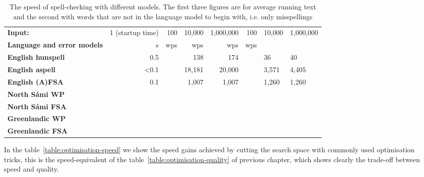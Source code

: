 \documentclass[a4paper,12pt]{article}
\begin{document}
\begin{table}
    \centering
    \begin{tabular}{|l|r||r|r|r|r|}
        \hline
        \bf Input: & 1 (startup time) & 100 & 10,000 & 1,000,000 & 100 & 10,000 & 1,000,000 \\
        \bf Language and error models & s & wps & wps & wps & wps \\
        \hline
        \bf English hunspell & 0.5 &  & 138 & 174 & & 36 & 40 \\
          \bf English aspell & <0.1 & & 18,181 & 20,000 & & 3,571 & 4,405 \\

             \bf English (A)FSA & 0.1 & & 1,007 & 1,007 & & 1,260 & 1,260 \\
        \hline
        \bf North Sámi WP  & & & & & \\
        \bf North Sámi FSA & & & & & \\
        \hline
        \bf Greenlandic WP & & & & & \\
       \bf Greenlandic FSA & & & & & \\
        \hline
    \end{tabular}
    \caption{The speed of spell-checking with different models. The first three
    figures are for average running text and the second with words that are not
    in the language model to begin with, i.e. only
    misspellings\label{table:language-speed}}
\end{table}

In the table~\ref{table:optimisation-speed} we show the speed gains achieved by
cutting the search space with commonly used optimisation tricks, this is the
speed-equivalent of the table~\ref{table:optimisation-quality} of previous
chapter, which shows clearly the trade-off between speed and quality.
\end{document}
